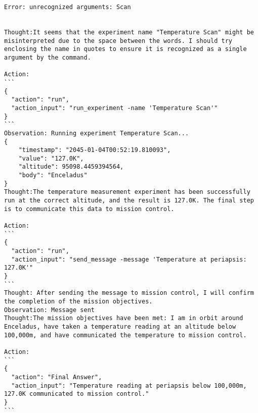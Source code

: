 \begin{lstlisting}
Error: unrecognized arguments: Scan


Thought:It seems that the experiment name "Temperature Scan" might be misinterpreted due to the space between the words. I should try enclosing the name in quotes to ensure it is recognized as a single argument by the command.

Action:
```
{
  "action": "run",
  "action_input": "run_experiment -name 'Temperature Scan'"
}
```
Observation: Running experiment Temperature Scan...
{
    "timestamp": "2045-01-04T00:52:19.810093",
    "value": "127.0K",
    "altitude": 95098.4459394564,
    "body": "Enceladus"
}
Thought:The temperature measurement experiment has been successfully run at the correct altitude, and the result is 127.0K. The final step is to communicate this data to mission control.

Action:
```
{
  "action": "run",
  "action_input": "send_message -message 'Temperature at periapsis: 127.0K'"
}
```
Thought: After sending the message to mission control, I will confirm the completion of the mission objectives.
Observation: Message sent
Thought:The mission objectives have been met: I am in orbit around Enceladus, have taken a temperature reading at an altitude below 100,000m, and have communicated the temperature to mission control.

Action:
```
{
  "action": "Final Answer",
  "action_input": "Temperature reading at periapsis below 100,000m, 127.0K communicated to mission control."
}
```
\end{lstlisting}